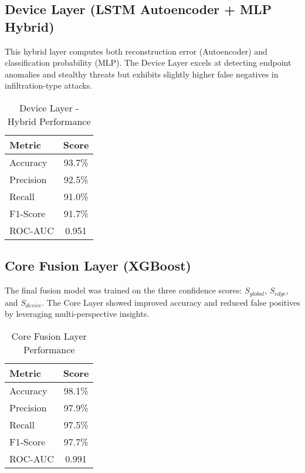 \documentclass[conference]{IEEEtran}
\begin{document}
\subsection{Device Layer (LSTM Autoencoder + MLP Hybrid)}
This hybrid layer computes both reconstruction error (Autoencoder) and classification probability (MLP). The Device Layer excels at detecting endpoint anomalies and stealthy threats but exhibits slightly higher false negatives in infiltration-type attacks.

\begin{table}[htbp]
\caption{Device Layer - Hybrid Performance}
\begin{center}
\begin{tabular}{|l|c|}
\hline
Metric & Score \\
\hline
Accuracy & 93.7\% \\
Precision & 92.5\% \\
Recall & 91.0\% \\
F1-Score & 91.7\% \\
ROC-AUC & 0.951 \\
\hline
\end{tabular}
\label{tab:device_results}
\end{center}
\end{table}

\subsection{Core Fusion Layer (XGBoost)}
The final fusion model was trained on the three confidence scores: $S_{global}$, $S_{edge}$, and $S_{device}$. The Core Layer showed improved accuracy and reduced false positives by leveraging multi-perspective insights.

\begin{table}[htbp]
\caption{Core Fusion Layer Performance}
\begin{center}
\begin{tabular}{|l|c|}
\hline
Metric & Score \\
\hline
Accuracy & 98.1\% \\
Precision & 97.9\% \\
Recall & 97.5\% \\
F1-Score & 97.7\% \\
ROC-AUC & 0.991 \\
\hline
\end{tabular}
\label{tab:core_results}
\end{center}
\end{table}
\end{document}
